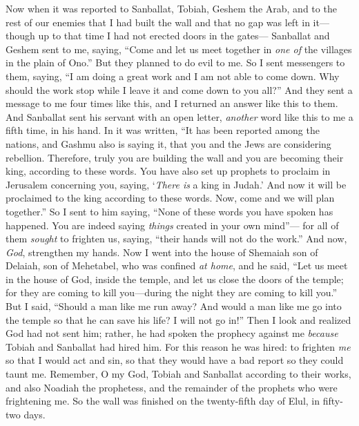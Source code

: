 \begin{biblechapter} %
 Now when it was reported to Sanballat, Tobiah, Geshem the Arab, and to the rest of our enemies that I had built the wall and that no gap was left in it—though up to that time I had not erected doors in the gates—
\verse Sanballat and Geshem sent to me, saying, “Come and let us meet together in \textit{one of} the villages in the plain of Ono.” But they planned to do evil to me.
\verse So I sent messengers to them, saying, “I am doing a great work and I am not able to come down. Why should the work stop while I leave it and come down to you all?”
\verse And they sent a message to me four times like this, and I returned an answer like this to them.
\verse And Sanballat sent his servant with an open letter, \textit{another} word like this to me a fifth time, in his hand.
\verse In it was written, “It has been reported among the nations, and Gashmu also is saying it, that you and the Jews are considering rebellion. Therefore, truly you are building the wall and you are becoming their king, according to these words.
\verse You have also set up prophets to proclaim in Jerusalem concerning you, saying, ‘\textit{There is} a king in Judah.’ And now it will be proclaimed to the king according to these words. Now, come and we will plan together.”
\verse So I sent to him saying, “None of these words you have spoken has happened. You are indeed saying \textit{things} created in your own mind”—
\verse for all of them \textit{sought} to frighten us, saying, “their hands will not do the work.” And now, \textit{God}, strengthen my hands.
\verse Now I went into the house of Shemaiah son of Delaiah, son of Mehetabel, who was confined \textit{at home}, and he said, “Let us meet in the house of God, inside the temple, and let us close the doors of the temple; for they are coming to kill you—during the night they are coming to kill you.”
\verse But I said, “Should a man like me run away? And would a man like me go into the temple so that he can save his life? I will not go in!”
\verse Then I look and realized God had not sent him; rather, he had spoken the prophecy against me \textit{because} Tobiah and Sanballat had hired him.
\verse For this reason he was hired: to frighten \textit{me} so that I would act and sin, so that they would have a bad report so they could taunt me.
\verse Remember, O my God, Tobiah and Sanballat according to their works, and also Noadiah the prophetess, and the remainder of the prophets who were frightening me.
 So the wall was finished on the twenty-fifth day of Elul, in fifty-two days.

\end{biblechapter}
